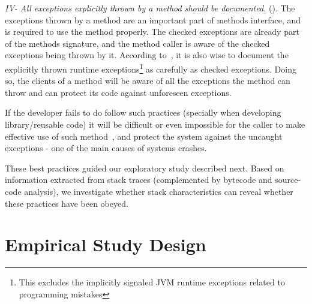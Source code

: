 \documentclass[conference]{IEEEtran}
\begin{document}


\emph{IV- All exceptions explicitly thrown by a method should be documented.}
(\cite{mandrioli1992advances,gosling2000java,wirfs2006toward,bloch2008effective}).
The exceptions thrown by a method are an important part of methods interface,
and is required to use the method properly. The checked exceptions are already
part of the  methods signature, and the method caller is aware of the checked
exceptions being thrown by it. According to~\cite{bloch2008effective}, it is
also wise to document the explicitly thrown runtime exceptions\footnote{This
excludes the implicitly signaled JVM runtime exceptions related to programming
mistakes} as carefully as checked exceptions. Doing so, the clients of a method
will be aware of all the exceptions the method can throw and can protect its code
against unforeseen exceptions. 

If the developer fails to do follow such practices (specially when developing 
library/reusable code) it will be difficult or even impossible for the caller to 
make effective use of such method~\cite{wirfs2006toward, bloch2008effective},
and protect the system against the uncaught exceptions - one of the main causes of 
systems crashes. 

These best practices guided our exploratory study described next.
Based on information extracted from stack traces (complemented by
bytecode and source-code analysis), we investigate whether stack characteristics
can reveal whether these practices have been obeyed.



\section{Empirical Study Design}
\label{sec:study}
\end{document}
